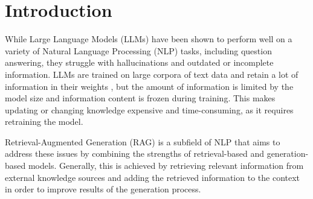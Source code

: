 \section{Introduction}

While Large Language Models (LLMs) have been shown to perform well on a variety of Natural Language Processing (NLP) tasks, including question answering, they struggle with hallucinations and outdated or incomplete information.
LLMs are trained on large corpora of text data and retain a lot of information in their weights \cite{petroni-etal-2019-language}, but the amount of information is limited by the model size and information content is frozen during training.
This makes updating or changing knowledge expensive and time-consuming, as it requires retraining the model.

Retrieval-Augmented Generation (RAG) is a subfield of NLP that aims to address these issues by combining the strengths of retrieval-based and generation-based models.
Generally, this is achieved by retrieving relevant information from external knowledge sources and adding the retrieved information to the context in order to improve results of the generation process.